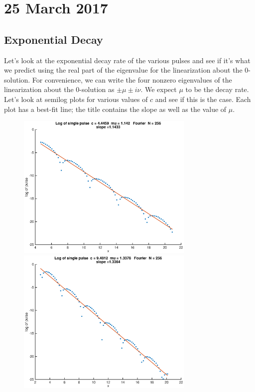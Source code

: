 \documentclass[12pt]{article}
\begin{document}
\section*{25 March 2017}

\subsection*{Exponential Decay}
Let's look at the exponential decay rate of the various pulses and see if it's what we predict using the real part of the eigenvalue for the linearization about the 0-solution. For convenience, we can write the four nonzero eigenvalues of the linearization about the 0-solution as $\pm \mu \pm i \nu$. We expect $\mu$ to be the decay rate. Let's look at semilog plots for various values of $c$ and see if this is the case. Each plot has a best-fit line; the title contains the slope as well as the value of $\mu$.

\begin{figure}[H]
\includegraphics[width=8.5cm]{logsingle444.eps}
\includegraphics[width=8.5cm]{logsingle948.eps}
\end{figure}
\end{document}
